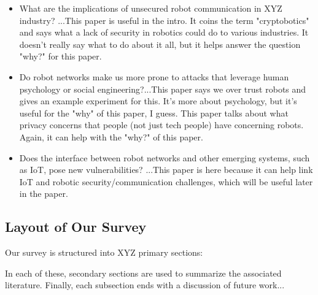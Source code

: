 \begin{itemize}[leftmargin = 10pt]

\item What are the implications of unsecured robot communication in XYZ industry? ...This paper \cite{Morante2015CryptoboticsWR} is useful in the intro. It coins the term "cryptobotics" and says what a lack of security in robotics could do to various industries. It doesn't really say what to do about it all, but it helps answer the question "why?" for this paper.

\item Do robot networks make us more prone to attacks that leverage human psychology or social engineering?...This paper \cite{booth17:piggybacking} says we over trust robots and gives an example experiment for this. It's more about psychology, but it's useful for the "why" of this paper, I guess. This paper \cite{Krupp2017} talks about what privacy concerns that people (not just tech people) have concerning robots. Again, it can help with the "why?" of this paper.

\item Does the interface between robot networks and other emerging systems, such as IoT, pose new vulnerabilities? ...This paper \cite{Mostefa2017} is here because it can help link IoT and robotic security/communication challenges, which will be useful later in the paper.
\end{itemize}


\subsection{Layout of Our Survey}

Our survey is structured into XYZ primary sections:


In each of these, secondary sections are used to summarize the associated literature. Finally, each subsection ends with a discussion of future work...









